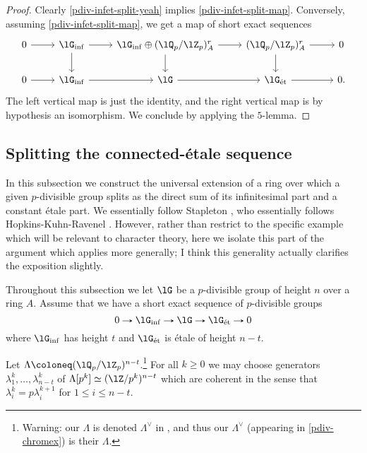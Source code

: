 \begin{proof}
  Clearly \cref{pdiv-infet-split-yeah}
  implies \cref{pdiv-infet-split-map}. Conversely, assuming
  \cref{pdiv-infet-split-map}, we get a map of short exact sequences
  \[
  \begin{tikzcd}
    0 \ar[r] &
    \lG_\inf \ar[r] \ar[d] &
    \lG_\inf \oplus (\lQ_p/\lZ_p)_A^r \ar[r] \ar[d] &
    (\lQ_p/\lZ_p)_A^r \ar[r] \ar[d] &
    0 \\
    0 \ar[r] &
    \lG_\inf \ar[r] &
    \lG \ar[r] &
    \lG_\et \ar[r] &
    0.
  \end{tikzcd}
  \]
  The left vertical map is just the identity, and the right vertical
  map is by hypothesis an isomorphism. We conclude by applying the
  $5$-lemma.
\end{proof}


\subsection{Splitting the connected-\'etale sequence}
\label{pdiv-split}

In this subsection we construct the universal extension of a ring over
which a given $p$-divisible group splits as the direct sum of its
infinitesimal part and a constant \'etale part. We essentially follow
Stapleton \cite[\S2.8]{stapleton-tgcm}, who essentially follows
Hopkins-Kuhn-Ravenel \cite[\S\S6.1--6.2]{hkr-char}. However, rather
than restrict to the specific example which will be relevant to
character theory, here we isolate this part of the argument which
applies more generally; I think this generality actually clarifies the
exposition slightly.

\begin{notation}
  \label{pdiv-split-ntn}
  Throughout this subsection we let $\lG$ be a $p$-divisible group of
  height $n$ over a ring $A$. Assume that we have a short exact
  sequence of $p$-divisible groups
  \[
  0 \to \lG_\inf \to \lG \to \lG_\et \to 0
  \]
  where $\lG_\inf$ has height $t$ and $\lG_\et$ is \'etale of height
  $n-t$.

  Let $\Lambda \ce (\lQ_p/\lZ_p)^{n-t}$.\footnote{Warning: our
    $\Lambda$ is denoted $\Lambda^\vee$ in
    \cite{hkr-char,stapleton-tgcm}, and thus our $\Lambda^\vee$
    (appearing in \cref{pdiv-chromex}) is their $\Lambda$.} For all
  $k \ge 0$ we may choose generators
  $\lambda^k_1, \ldots, \lambda^k_{n-t}$ of
  $\Lambda[p^k] \iso (\lZ/p^k)^{n-t}$ which are coherent in the sense
  that $\lambda^k_i = p\lambda^{k+1}_i$ for $1 \le i \le n-t$.
\end{notation}

